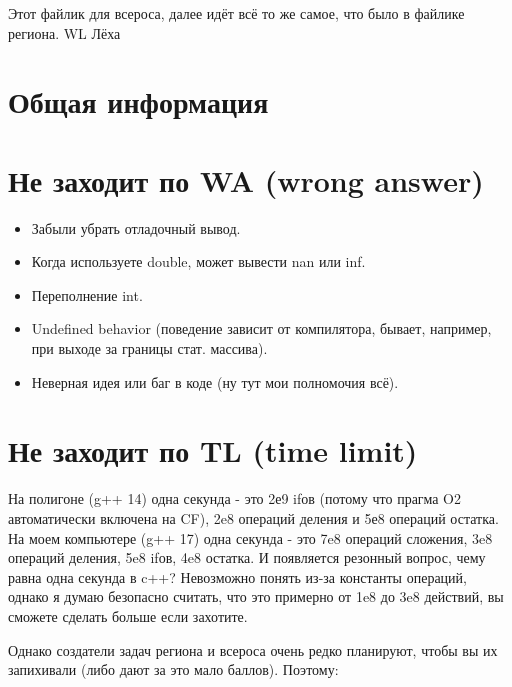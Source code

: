\documentclass[12pt,a4paper]{article}
\begin{document}
Этот файлик для всероса, далее идёт всё то же самое, что было в файлике региона. WL Лёха

\section*{Общая информация}

\section*{Не заходит по WA (wrong answer)}

\begin{itemize}
\item Забыли убрать отладочный вывод.
\item Когда используете double, может вывести nan или inf.
\item Переполнение int.
\item Undefined behavior (поведение зависит от компилятора, бывает, например, при выходе за границы стат. массива).
\item Неверная идея или баг в коде (ну тут мои полномочия всё).
\end{itemize}

\section*{Не заходит по TL (time limit)}

На полигоне (g++ 14) одна секунда - это 2е9 ifов (потому что прагма O2 автоматически включена на CF), 2e8 операций деления и 5е8 операций остатка. На моем компьютере (g++ 17) одна секунда - это 7e8 операций сложения, 3e8 операций деления, 5e8 ifов, 4e8 остатка. И появляется резонный вопрос, чему равна одна секунда в c++? Невозможно понять из-за константы операций, однако я думаю безопасно считать, что это примерно от 1e8 до 3e8 действий, вы сможете сделать больше если захотите.

Однако создатели задач региона и всероса очень редко планируют, чтобы вы их запихивали (либо дают за это мало баллов). Поэтому:

\bigskip
\end{document}
